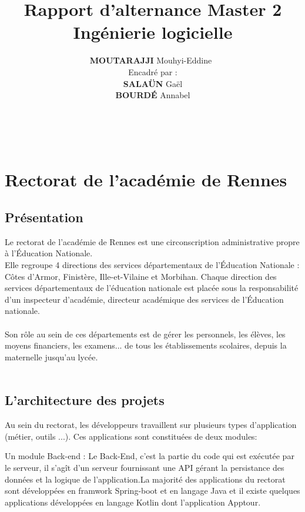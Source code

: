 \documentclass[a4paper]{article}
\title{\textbf{Rapport d'alternance Master 2 Ingénierie logicielle\\ }}
\author{\textbf{MOUTARAJJI} Mouhyi-Eddine\
\\Encadré par :\\\textbf{SALAÜN} Gaël \\\textbf{BOURDÉ} Annabel }
\begin{document}
\date{}




\maketitle

\newpage

\tableofcontents
~
\newpage



\section{Rectorat de l’académie de Rennes} 

\subsection{Présentation}

Le rectorat de l'académie de Rennes est une circonscription administrative propre à
l’Éducation Nationale.\\
Elle regroupe 4 directions des services départementaux de l'Éducation Nationale : 
Côtes d'Armor, Finistère, Ille-et-Vilaine et Morbihan. Chaque direction des services départementaux de l'éducation nationale est placée sous la responsabilité d'un inspecteur d'académie, directeur académique des services de l'Éducation nationale.\\\\
Son rôle au sein de ces départements est de gérer les personnels, les élèves, les moyens financiers, les examens... de tous les établissements scolaires, depuis la maternelle jusqu'au lycée.\\\\

\subsection{L'architecture des projets}

Au sein du rectorat, les développeurs travaillent sur plusieurs types d'application (métier, outils ...). Ces applications sont constituées de deux modules: 

Un module Back-end : Le Back-End, c’est la partie du code qui est exécutée par le serveur, il s’agît d'un serveur fournissant une API gérant la persistance des données et la logique de l'application.La majorité des applications du rectorat sont développées en framwork Spring-boot et en langage Java et il existe quelques applications développées en langage Kotlin dont l'application Apptour.
\end{document}

